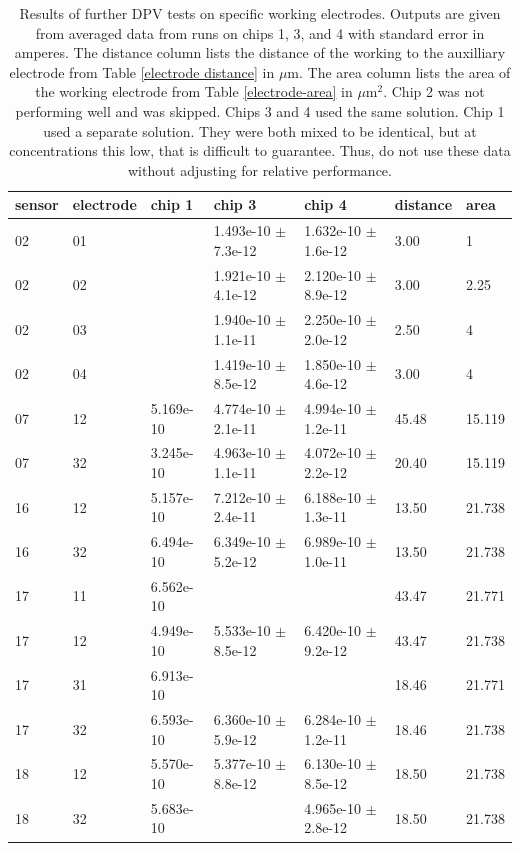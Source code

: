 \begin{table}
	\begin{tabular}{lllllll}
		sensor & electrode & chip 1 & chip 3 & chip 4 & distance & area \\
		\hline
		02 & 01 &           & 1.493e-10 $\pm$ 7.3e-12 & 1.632e-10 $\pm$ 1.6e-12 &  3.00 & 1 \\
		02 & 02 &           & 1.921e-10 $\pm$ 4.1e-12 & 2.120e-10 $\pm$ 8.9e-12 &  3.00 & 2.25 \\
		02 & 03 &           & 1.940e-10 $\pm$ 1.1e-11 & 2.250e-10 $\pm$ 2.0e-12 &  2.50 & 4 \\
		02 & 04 &           & 1.419e-10 $\pm$ 8.5e-12 & 1.850e-10 $\pm$ 4.6e-12 &  3.00 & 4 \\
		07 & 12 & 5.169e-10 & 4.774e-10 $\pm$ 2.1e-11 & 4.994e-10 $\pm$ 1.2e-11 & 45.48 & 15.119 \\
		07 & 32 & 3.245e-10 & 4.963e-10 $\pm$ 1.1e-11 & 4.072e-10 $\pm$ 2.2e-12 & 20.40 & 15.119 \\
		16 & 12 & 5.157e-10 & 7.212e-10 $\pm$ 2.4e-11 & 6.188e-10 $\pm$ 1.3e-11 & 13.50 & 21.738 \\
		16 & 32 & 6.494e-10 & 6.349e-10 $\pm$ 5.2e-12 & 6.989e-10 $\pm$ 1.0e-11 & 13.50 & 21.738 \\
		17 & 11 & 6.562e-10 &                         &                         & 43.47 & 21.771 \\
		17 & 12 & 4.949e-10 & 5.533e-10 $\pm$ 8.5e-12 & 6.420e-10 $\pm$ 9.2e-12 & 43.47 & 21.738 \\
		17 & 31 & 6.913e-10 &                         &                         & 18.46 & 21.771 \\
		17 & 32 & 6.593e-10 & 6.360e-10 $\pm$ 5.9e-12 & 6.284e-10 $\pm$ 1.2e-11 & 18.46 & 21.738 \\
		18 & 12 & 5.570e-10 & 5.377e-10 $\pm$ 8.8e-12 & 6.130e-10 $\pm$ 8.5e-12 & 18.50 & 21.738 \\
		18 & 32 & 5.683e-10 &                         & 4.965e-10 $\pm$ 2.8e-12 & 18.50 & 21.738

	\end{tabular}
	\caption[Results of further DPV tests on specific working electrodes.]{Results of further DPV tests on specific working electrodes. Outputs are given from averaged data from runs on chips 1, 3, and 4 with standard error in amperes. The distance column lists the distance of the working to the auxilliary electrode from Table \ref{electrode distance} in $\mu \mathrm{m}$. The area column lists the area of the working electrode from Table \ref{electrode-area} in $\mu \mathrm{m}^2$. Chip 2 was not performing well and was skipped. Chips 3 and 4 used the same solution. Chip 1 used a separate solution. They were both mixed to be identical, but at concentrations this low, that is difficult to guarantee. Thus, do not use these data without adjusting for relative performance.}
	\label{dpv-specific}
\end{table}

